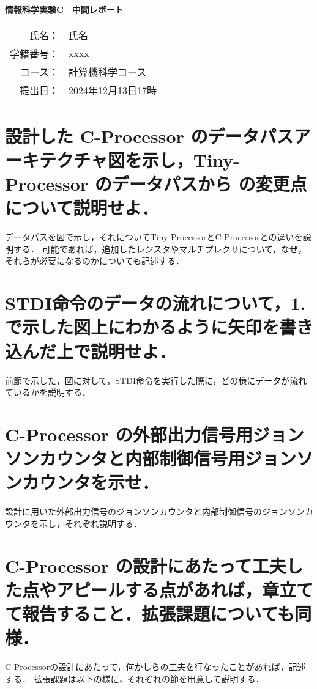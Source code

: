 \documentclass[a4paper,10pt]{jarticle}
\begin{document}
\thispagestyle{empty}



\begin{center}

\vspace*{50mm}
\textbf{\Huge{情報科学実験C　中間レポート}}\\
\vspace*{60mm}
\Large{
\begin{tabular}{rl}
氏名：&氏名\\
学籍番号：&xxxx\\
コース：&計算機科学コース\\
提出日：&2024年12月13日17時
\end{tabular}
}
\end{center}
\newpage


\section{設計した C-Processor のデータパスアーキテクチャ図を示し，Tiny-Processor のデータパスから
の変更点について説明せよ．}
データパスを図で示し，それについてTiny-ProcessorとC-Processorとの違いを説明する．
可能であれば，追加したレジスタやマルチプレクサについて，なぜ，それらが必要になるのかについても記述する．
~\\
\section{STDI命令のデータの流れについて，1.で示した図上にわかるように矢印を書き込んだ上で説明せよ．}
前節で示した，図に対して，STDI命令を実行した際に，どの様にデータが流れているかを説明する．
~\\
\section{C-Processor の外部出力信号用ジョンソンカウンタと内部制御信号用ジョンソンカウンタを示せ．}
設計に用いた外部出力信号のジョンソンカウンタと内部制御信号のジョンソンカウンタを示し，それぞれ説明する．
~\\
\section{C-Processor の設計にあたって工夫した点やアピールする点があれば，章立てて報告すること．拡張課題についても同様．}
C-Processorの設計にあたって，何かしらの工夫を行なったことがあれば，記述する．
拡張課題は以下の様に，それぞれの節を用意して説明する．
\end{document}

